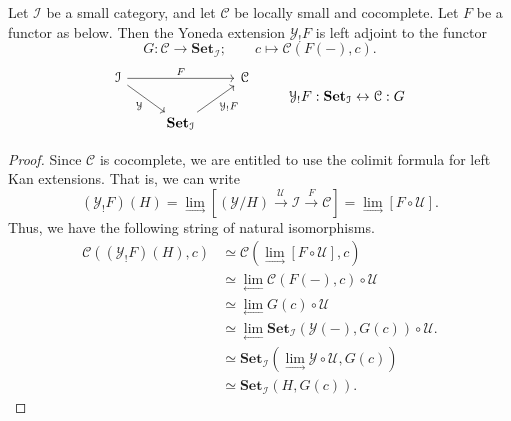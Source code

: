 \documentclass[main.tex]{subfiles}
\begin{document}
\begin{lemma}
  \label{lemma:right_adjoint_to_yoneda_extension}
  Let $\mathcal{I}$ be a small category, and let $\mathcal{C}$ be locally small and cocomplete. Let $F$ be a functor as below. Then the Yoneda extension $\mathcal{Y}_{!}F$ is left adjoint to the functor
  \begin{equation*}
    G\colon \mathcal{C} \to \mathbf{Set}_{\mathcal{I}};\qquad c \mapsto \mathcal{C}(F(-), c).
  \end{equation*}
  \begin{equation*}
    \begin{tikzcd}
      \mathcal{I}
      \arrow[rr, "F"]
      \arrow[dr, swap, "\mathcal{Y}"]
      && \mathcal{C}
      \\
      & {\mathbf{Set}_{\mathcal{I}}}
      \arrow[ur, swap, "\mathcal{Y}_{!}F"]
    \end{tikzcd}
    \qquad
    \begin{tikzcd}
      \mathcal{Y}_{!}F : \mathbf{Set}_{\mathcal{I}} \leftrightarrow \mathcal{C} : G
    \end{tikzcd}
  \end{equation*}
\end{lemma}
\begin{proof}
  Since $\mathcal{C}$ is cocomplete, we are entitled to use the colimit formula for left Kan extensions. That is, we can write
  \begin{equation*}
    (\mathcal{Y}_{!}F)(H) = \lim_{\rightarrow} \left[ (\mathcal{Y} / H) \overset{\mathcal{U}}{\to} \mathcal{I} \overset{F}{\to} \mathcal{C} \right] = \lim_{\rightarrow}\left[ F \circ \mathcal{U} \right].
  \end{equation*}
  Thus, we have the following string of natural isomorphisms.
  \begin{align*}
    \mathcal{C}((\mathcal{Y}_{!}F)(H), c) &\simeq \mathcal{C}(\lim_{\rightarrow} [F \circ \mathcal{U}], c) \\
    &\simeq \lim_{\leftarrow}\mathcal{C}(F(-), c) \circ \mathcal{U} \\
    &\simeq \lim_{\leftarrow} G(c) \circ \mathcal{U} \\
    &\simeq \lim_{\leftarrow}\mathbf{Set}_{\mathcal{I}}(\mathcal{Y}(-), G(c)) \circ \mathcal{U}. \\
    &\simeq\mathbf{Set}_{\mathcal{I}}(\lim_{\rightarrow}\mathcal{Y} \circ \mathcal{U}, G(c)) \\
    &\simeq\mathbf{Set}_{\mathcal{I}}(H, G(c)).
  \end{align*}
\end{proof}
\end{document}
